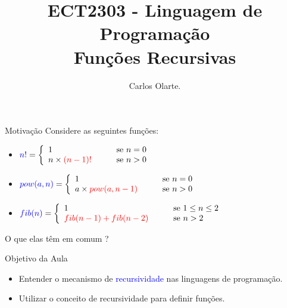 \documentclass{beamer}
\title[ECT2303 - Funções Recursivas\;\;\;\;\; \insertpagenumber]
{ECT2303 - Linguagem de Programação \\ Funções Recursivas}
\author[]{Carlos Olarte. 
}
\institute{
}
\newcommand{\blue}[1]{\textcolor{blue}{#1}}
\newcommand{\red}[1]{\textcolor{red}{#1}}
\begin{document}
 

\frame{\titlepage}

\begin{frame}[fragile]{Motivação}
Considere as seguintes funções:
\begin{itemize}
 \item $\blue{n!} = 
 \left\{ \begin{array}{lll}
 1 & \quad& \mbox{se }n=0\\
 n \times \red{(n-1)!} & &\mbox{se }n > 0
 \end{array}
 \right.$
 \item $\blue{pow(a,n)} = 
 \left\{ \begin{array}{lll}
 1 & \quad& \mbox{se }n=0\\
 a \times \red{pow(a,n-1)} & &\mbox{se }n > 0
 \end{array}
 \right.$
 \item $\blue{fib(n)} = 
 \left\{ \begin{array}{lll}
 1 & \quad& \mbox{se } 1 \leq n \leq 2\\
 \red{fib(n-1) + fib(n-2)} & &\mbox{se }n > 2
 \end{array}
 \right.$
\end{itemize}

\begin{block}{}
O que elas têm em comum ? 
\end{block}

\end{frame}

\begin{frame}[fragile]{Objetivo da Aula}

\begin{itemize}
 \item Entender o mecanismo de \blue{recursividade} nas linguagens de programação. 
 \item Utilizar o conceito de recursividade para definir funções. 

\end{itemize}


\end{frame}
\end{document}
